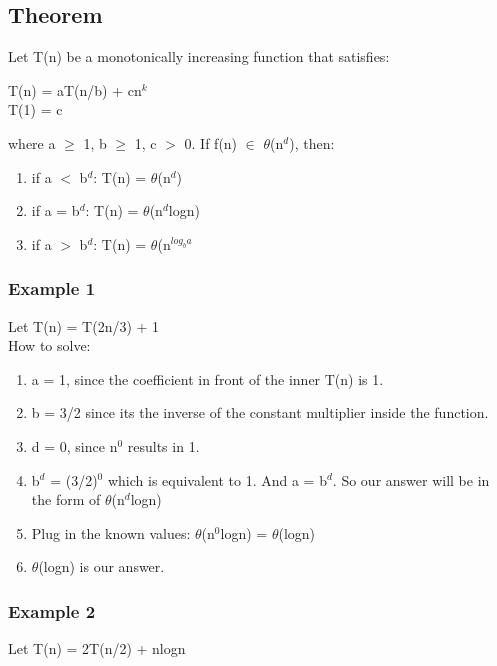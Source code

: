 \documentclass{article}
\begin{document}
\subsection{Theorem}
Let T(n) be a monotonically increasing function that satisfies:\\

\begin{center}
    T(n) = aT(n/b) + cn$^k$\\
    T(1) = c
\end{center}

where a $\ge$ 1, b $\ge$ 1, c $>$ 0. If f(n) $\in$ $\theta$(n$^d$), then:\\

\begin{enumerate}
    \item if a $<$ b$^d$: T(n) = $\theta$(n$^d$)
    \item if a = b$^d$: T(n) = $\theta$(n$^d$logn)
    \item if a $>$ b$^d$: T(n) = $\theta$(n$^{log_ba}$
\end{enumerate}

\subsubsection{Example 1}
Let T(n) = T(2n/3) + 1\\

How to solve:
\begin{enumerate}
    \item a = 1, since the coefficient in front of the inner T(n) is 1.
    \item b = 3/2 since its the inverse of the constant multiplier inside the function.
    \item d = 0, since n$^0$ results in 1.
    \item b$^d$ = (3/2)$^0$ which is equivalent to 1. And a = b$^d$. So our answer will be in the form of $\theta$(n$^d$logn)
    \item Plug in the known values: $\theta$(n$^0$logn) = $\theta$(logn)
    \item $\theta$(logn) is our answer.
\end{enumerate}

\subsubsection{Example 2}
Let T(n) = 2T(n/2) + nlogn\\
\end{document}
